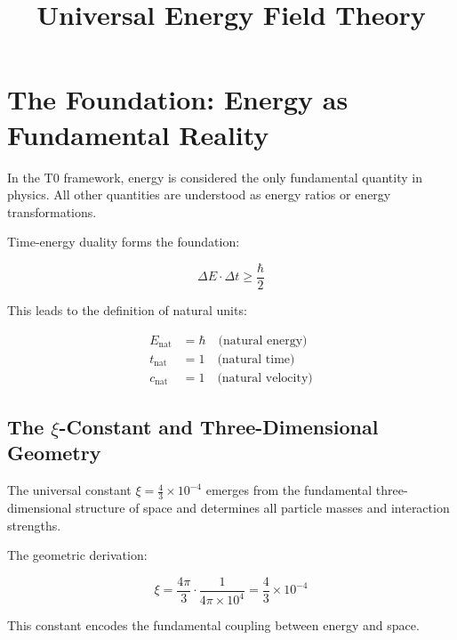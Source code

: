 \documentclass[12pt,a4paper]{report}
\begin{document}
	\section{The Foundation: Energy as Fundamental Reality}
	
	\begin{principle}
		In the T0 framework, energy is considered the only fundamental quantity in physics. All other quantities are understood as energy ratios or energy transformations.
	\end{principle}
	
	Time-energy duality forms the foundation:
	
	\begin{equation}
		\Delta E \cdot \Delta t \geq \frac{\hbar}{2}
	\end{equation}
	
	This leads to the definition of natural units:
	
	\begin{align}
		E_{\text{nat}} &= \hbar \quad \text{(natural energy)} \\
		t_{\text{nat}} &= 1 \quad \text{(natural time)} \\
		c_{\text{nat}} &= 1 \quad \text{(natural velocity)}
	\end{align}
	
	\subsection{The $\xi$-Constant and Three-Dimensional Geometry}
	
	\begin{insight}
		The universal constant $\xi = \frac{4}{3} \times 10^{-4}$ emerges from the fundamental three-dimensional structure of space and determines all particle masses and interaction strengths.
	\end{insight}
	
	The geometric derivation:
	
	\begin{equation}
		\xi = \frac{4\pi}{3} \cdot \frac{1}{4\pi \times 10^4} = \frac{4}{3} \times 10^{-4}
	\end{equation}
	
	This constant encodes the fundamental coupling between energy and space.
	
	\title{Universal Energy Field Theory}
\maketitle
	
\end{document}
